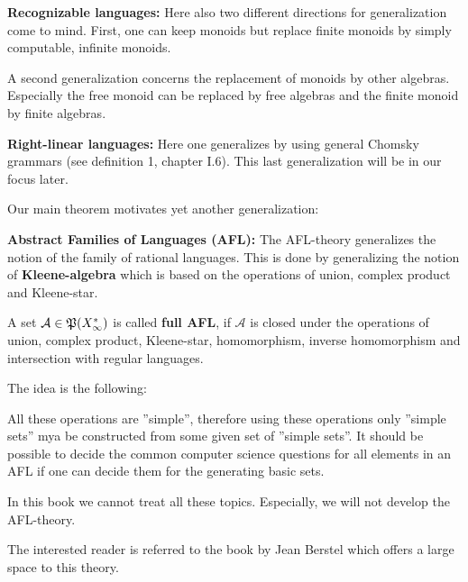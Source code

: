 {\bf Recognizable languages:} Here also two different directions for
generalization come to mind. First, one can keep monoids but replace finite
monoids by simply computable, infinite monoids.

A second generalization concerns the replacement of monoids by other algebras.
Especially the free monoid can be replaced by free algebras and the finite
monoid by finite algebras.

{\bf Right-linear languages:} Here one generalizes by using general Chomsky
grammars (see definition 1, chapter I.6). This last generalization will be in
our focus later.

Our main theorem motivates yet another generalization:

{\bf Abstract Families of Languages (AFL):} The AFL-theory generalizes the
notion of the family of rational languages. This is done by generalizing the
notion of {\bf Kleene-algebra} which is based on the operations of union,
complex product and Kleene-star.

A set $\mathcal{A} \in \mathfrak{P}({X_\infty^*})$ is called {\bf full AFL}, if
$\mathcal{A}$ is closed under the operations of union, complex product,
Kleene-star, homomorphism, inverse homomorphism and intersection with
regular languages.

The idea is the following:

All these operations are ''simple'', therefore using these operations only
''simple sets'' mya be constructed from some given set of ''simple sets''.	It
should be possible to decide the common computer science questions for all	
elements in an AFL if one can decide them for the generating basic sets.

In this book we cannot treat all these topics. Especially, we will not
develop the AFL-theory.

The interested reader is referred to the book by Jean Berstel \cite{Berstel79}
which offers a large space to this theory.
